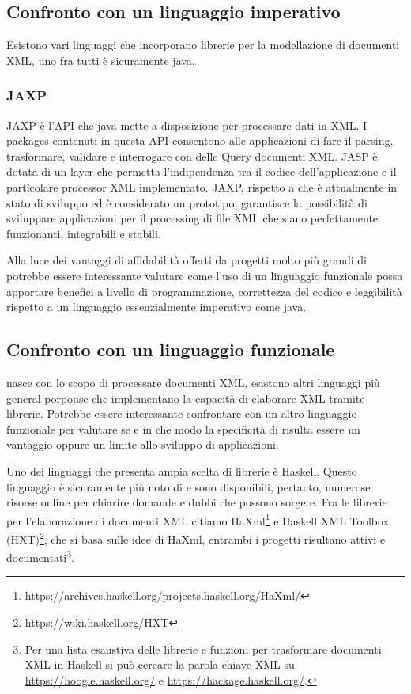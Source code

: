 \subsection{Confronto con un linguaggio imperativo}
Esistono vari linguaggi che incorporano librerie per la modellazione di documenti XML, uno fra tutti è sicuramente java.
\subsubsection{JAXP}
JAXP \cite{JAXP} è l'API che java mette a disposizione per processare dati in XML. I packages contenuti in questa API consentono alle applicazioni di fare il parsing, trasformare, validare e interrogare con delle Query documenti XML. JASP è dotata di un layer che permetta l'indipendenza tra il codice dell'applicazione e il particolare processor XML implementato. JAXP, rispetto a \cduce che è attualmente in stato di sviluppo ed è considerato un prototipo, garantisce la possibilità di sviluppare applicazioni per il processing di file XML che siano perfettamente funzionanti, integrabili e stabili.

Alla luce dei vantaggi di affidabilità offerti da progetti molto più grandi di \cduce potrebbe essere interessante valutare come l'uso di un linguaggio funzionale possa apportare benefici a livello di programmazione, correttezza del codice e leggibilità rispetto a un linguaggio essenzialmente imperativo come java.
\subsection{Confronto con un linguaggio funzionale}
\cduce nasce con lo scopo di processare documenti XML, esistono altri linguaggi più general porpouse che implementano la capacità di elaborare XML tramite librerie. Potrebbe essere interessante confrontare \cduce con un altro linguaggio funzionale per valutare se e in che modo la specificità di \cduce risulta essere un vantaggio oppure un limite allo sviluppo di applicazioni.

Uno dei linguaggi che presenta ampia scelta di librerie è Haskell. Questo linguaggio è sicuramente più noto di \cduce e sono disponibili, pertanto, numerose risorse online per chiarire domande e dubbi che possono sorgere. Fra le librerie per l'elaborazione di documenti XML citiamo HaXml\footnote{\url{https://archives.haskell.org/projects.haskell.org/HaXml/}} e Haskell XML Toolbox (HXT)\footnote{\url{https://wiki.haskell.org/HXT}}, che si basa sulle idee di HaXml, entrambi i progetti risultano attivi e documentati\footnote{Per una lista esaustiva delle librerie e funzioni per trasformare documenti XML in Haskell si può cercare la parola chiave XML su \url{https://hoogle.haskell.org/} e \url{https://hackage.haskell.org/}.}.


